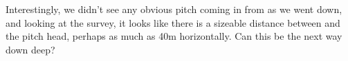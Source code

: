 Interestingly, we didn't see any obvious pitch coming in from  as we went down, and looking at the survey, it looks like there is a sizeable distance between  and the pitch head, perhaps as much as 40m horizontally. Can this be the next way down deep?

